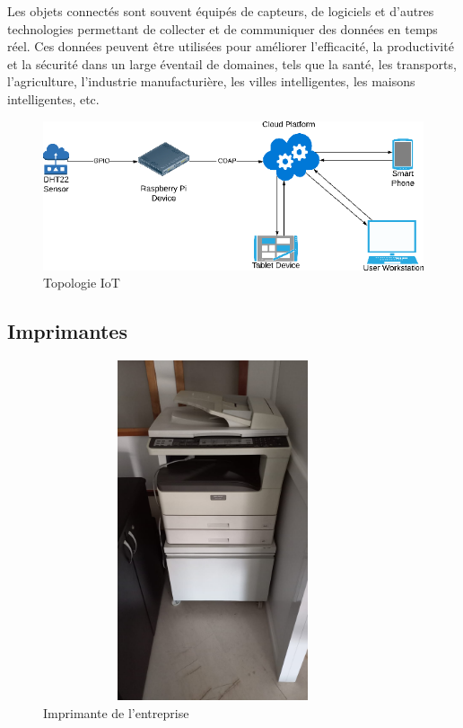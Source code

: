  Les objets connectés sont souvent équipés de capteurs, de logiciels et d'autres technologies permettant de collecter et de communiquer des données en temps réel. Ces données peuvent être utilisées pour améliorer l'efficacité, la productivité et la sécurité dans un large éventail de domaines, tels que la santé, les transports, l'agriculture, l'industrie manufacturière, les villes intelligentes, les maisons intelligentes, etc. \\

\begin{figure}[H]
 \centering
    \includegraphics[width=15cm]{Images/IoT-Topo2.png}
    \caption{Topologie IoT}
    \label{Chap4.2.1}
\end{figure}    
\smallskip


\subsection{Imprimantes}

\begin{figure}[H]
 \centering
    \includegraphics[width=10cm,height=10cm]{Images/BRades-Imprimante.jpg}
    \caption{Imprimante de l'entreprise}
    \label{Chap4.2.2}
\end{figure}    
\smallskip

